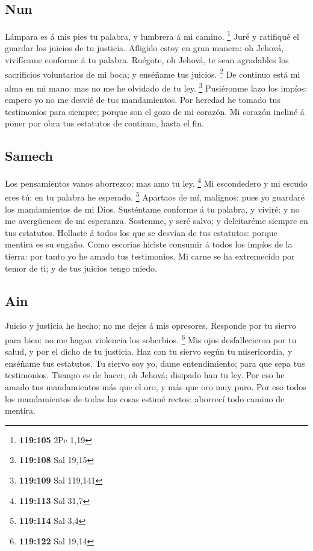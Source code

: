 \hypertarget{nun}{%
\subsection{Nun}\label{nun}}

 Lámpara es á mis pies tu palabra, y lumbrera á mi camino.
\footnote{\textbf{119:105} 2Pe 1,19}  Juré y ratifiqué el
guardar los juicios de tu justicia.  Afligido estoy en
gran manera: oh Jehová, vivifícame conforme á tu palabra. 
Ruégote, oh Jehová, te sean agradables los sacrificios voluntarios de mi
boca; y enséñame tus juicios. \footnote{\textbf{119:108} Sal 19,15}
 De continuo está mi alma en mi mano: mas no me he
olvidado de tu ley. \footnote{\textbf{119:109} Sal 119,141}
 Pusiéronme lazo los impíos: empero yo no me desvié de tus
mandamientos.  Por heredad he tomado tus testimonios para
siempre; porque son el gozo de mi corazón.  Mi corazón
incliné á poner por obra tus estatutos de continuo, hasta el fin.

\hypertarget{samech}{%
\subsection{Samech}\label{samech}}

 Los pensamientos vanos aborrezco; mas amo tu ley.
\footnote{\textbf{119:113} Sal 31,7}  Mi escondedero y mi
escudo eres tú: en tu palabra he esperado. \footnote{\textbf{119:114}
  Sal 3,4}  Apartaos de mí, malignos; pues yo guardaré los
mandamientos de mi Dios.  Susténtame conforme á tu
palabra, y viviré: y no me avergüences de mi esperanza. 
Sostenme, y seré salvo; y deleitaréme siempre en tus estatutos.
 Hollaste á todos los que se desvían de tus estatutos:
porque mentira es su engaño.  Como escorias hiciste
consumir á todos los impíos de la tierra: por tanto yo he amado tus
testimonios.  Mi carne se ha extremecido por temor de ti;
y de tus juicios tengo miedo.

\hypertarget{ain}{%
\subsection{Ain}\label{ain}}

 Juicio y justicia he hecho; no me dejes á mis opresores.
 Responde por tu siervo para bien: no me hagan violencia
los soberbios. \footnote{\textbf{119:122} Sal 19,14}  Mis
ojos desfallecieron por tu salud, y por el dicho de tu justicia.
 Haz con tu siervo según tu misericordia, y enséñame tus
estatutos.  Tu siervo soy yo, dame entendimiento; para que
sepa tus testimonios.  Tiempo es de hacer, oh Jehová;
disipado han tu ley.  Por eso he amado tus mandamientos
más que el oro, y más que oro muy puro.  Por eso todos los
mandamientos de todas las cosas estimé rectos: aborrecí todo camino de
mentira.

